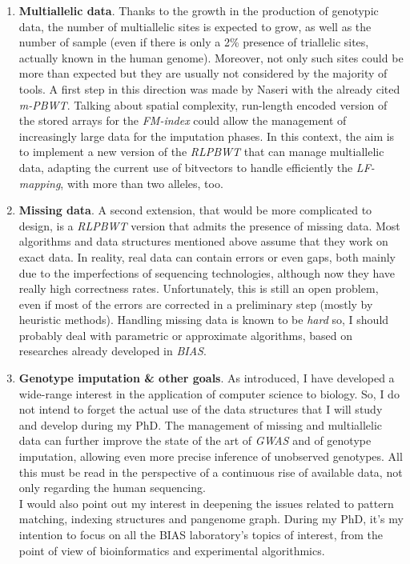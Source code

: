 \documentclass[a4paper,11pt, oneside]{article}
\begin{document}
\begin{enumerate}[leftmargin=.2in]
  \setlength\itemsep{-0.2em}
  \item \textbf{Multiallelic data}. Thanks to the growth in the
  production of genotypic data, the number of multiallelic sites is expected to
  grow, as well as the number of sample (even if there is only a 2\% presence of
  triallelic sites, actually known in the human genome). Moreover, not only
  such sites could be more than expected but they are 
  usually not considered by the majority of tools. A first step in this
  direction was made 
  by Naseri with the already cited \textit{m-PBWT}.
  Talking about spatial complexity, run-length encoded version of the stored
  arrays for the \textit{FM-index} could allow the management of increasingly
  large data for the imputation phases.   
  In this context, the aim is to implement a new 
  version of the \textit{RLPBWT} that can manage multiallelic data, adapting the
  current use of bitvectors to handle efficiently the \textit{LF-mapping},
  with more than two alleles, too. 
  \item \textbf{Missing data}. A second extension, that would be more
  complicated to 
  design, is a \textit{RLPBWT} version that admits the presence of
  missing data. Most algorithms and data structures mentioned above assume that
  they work on exact data. In reality, real data can contain errors or even
  gaps, both mainly due to the imperfections of sequencing technologies,
  although now they have really high correctness rates. Unfortunately, this is
  still an open problem, even if most of the errors are corrected in a
  preliminary step (mostly by heuristic methods).
  Handling missing data is known to be \textit{hard} so, I should
  probably deal with parametric or approximate algorithms, based on
  researches already developed in \textit{BIAS}.
  \item \textbf{Genotype imputation \& other goals}. As introduced, I have
  developed a wide-range interest in the application of computer science to
  biology. So, I do 
  not intend to forget the actual use of the data structures that I will study
  and develop during my PhD. The management of missing and
  multiallelic data can further improve the state of the art of \textit{GWAS}
  and of genotype imputation, allowing even more precise inference of unobserved
  genotypes. All this must be read in the perspective of 
  a continuous rise of available data, not only regarding the human
  sequencing. \\
  I would also  point out my interest in deepening the issues related to
  pattern matching, indexing structures and pangenome graph. During
  my PhD, it’s my intention to focus on all the BIAS laboratory's topics of
  interest, from the point of view of bioinformatics and experimental 
  algorithmics. 
\end{enumerate}
\end{document}
